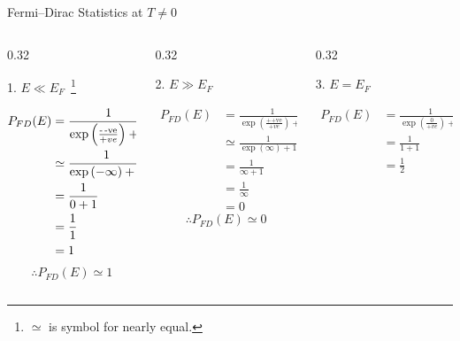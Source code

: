 \begin{frame}[label=pre-M2T1-slot1]{Fermi--Dirac Statistics at $T \neq 0$}
	\begin{columns}
		\begin{column}[t]{0.32\textwidth}
			\begin{center}
				1. \(E \ll E_F\)~\footnote{\(\simeq\) is symbol for nearly equal.}
			\end{center}
			\begin{align*}
				P_{FD}(E) &= \frac{1}{\exp\left(\frac{\text{-\,-ve}}{+ve}\right) + 1}\\
				&\simeq \frac{1}{\exp\left(-\infty\right) + 1}\\
				&= \frac{1}{0 + 1}\\
				&= \frac{1}{1}\\
				&= 1
			\end{align*}
			\[
			\therefore P_{FD}(E) \simeq 1
			\]
		\end{column}
		\begin{column}[t]{0.32\textwidth}
			\begin{center}
				2. \(E \gg E_F\)
			\end{center}
			\begin{align*}
				P_{FD}(E) &= \frac{1}{\exp\left(\frac{\text{++ve}}{+ve}\right) + 1}\\
				&\simeq \frac{1}{\exp\left(\infty\right) + 1}\\
				&= \frac{1}{\infty + 1}\\
				&= \frac{1}{\infty}\\
				&= 0
			\end{align*}
			\[
			\therefore P_{FD}(E) \simeq 0
			\]
		\end{column}
		\begin{column}[t]{0.32\textwidth}
			\begin{center}
				3. \(E = E_F\)
			\end{center}
			\begin{align*}
				P_{FD}(E) &= \frac{1}{\exp\left(\frac{0}{+ve}\right) + 1}	\\
				& = \frac{1}{1 + 1}\\
				&= \frac{1}{2}
			\end{align*}
		\end{column}
	\end{columns}
\end{frame}

